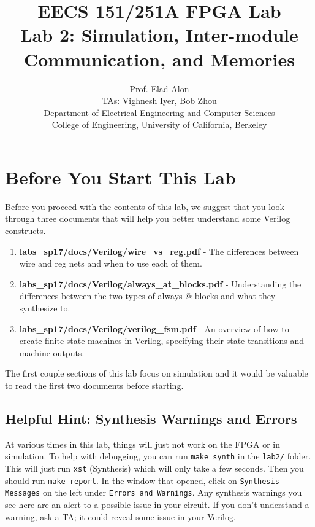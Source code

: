 \documentclass[11pt]{article}
\begin{document}
\title{EECS 151/251A FPGA Lab\\
Lab 2: Simulation, Inter-module Communication, and Memories}

\author{Prof. Elad Alon \\
TAs: Vighnesh Iyer, Bob Zhou \\Department of Electrical Engineering and Computer Sciences\\
College of Engineering, University of California, Berkeley}
\date{}
\maketitle

\tableofcontents

\section{Before You Start This Lab}

Before you proceed with the contents of this lab, we suggest that you look through three documents that will help you better understand some Verilog constructs.

\begin{enumerate}
	\item \textbf{labs\_sp17/docs/Verilog/wire\_vs\_reg.pdf} - The differences between wire and reg nets and when to use each of them.
	
	\item \textbf{labs\_sp17/docs/Verilog/always\_at\_blocks.pdf} - Understanding the differences between the two types of always @ blocks and what they synthesize to.
	
	\item \textbf{labs\_sp17/docs/Verilog/verilog\_fsm.pdf} - An overview of how to create finite state machines in Verilog, specifying their state transitions and machine outputs.
\end{enumerate}

The first couple sections of this lab focus on simulation and it would be valuable to read the first two documents before starting.

\subsection{Helpful Hint: Synthesis Warnings and Errors}
At various times in this lab, things will just not work on the FPGA or in simulation. To help with debugging, you can run \verb|make synth| in the \verb|lab2/| folder. This will just run \verb|xst| (Synthesis) which will only take a few seconds. Then you should run \verb|make report|. In the window that opened, click on \verb|Synthesis Messages| on the left under \verb|Errors and Warnings|. Any synthesis warnings you see here are an alert to a possible issue in your circuit. If you don't understand a warning, ask a TA; it could reveal some issue in your Verilog.
\end{document}
